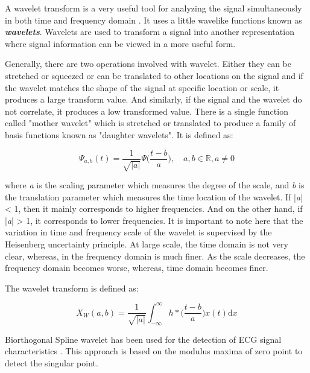 A wavelet transform is a very useful tool for analyzing the signal simultaneously in both time and frequency domain \cite{addison2017illustrated}. It uses a little wavelike functions known as \textbf{\textit{wavelets}}. Wavelets are used to transform a signal into another representation where signal information can be viewed in a more useful form.

Generally, there are two operations involved with wavelet. Either they can be stretched or squeezed or can be translated to other locations on the signal and if the wavelet matches the shape of the signal at specific location or scale, it produces a large transform value. And similarly, if the signal and the wavelet do not correlate, it produces a low transformed value. There is a single function called "mother wavelet" which is stretched or translated to produce a family of basis functions known as "daughter wavelets". It is defined as:

\begin{equation} \label{eqn_mother_wavelet}
{\Psi_{a,b}(t) = \frac{1}{\sqrt{|a|}}\Psi \bigg(\frac{t-b}{a}\bigg),\quad a, b \in \mathbb{R}, a \neq 0}
\end{equation}

where \textit{a} is the scaling parameter which measures the degree of the scale, and \textit{b} is the translation parameter which measures the time location of the wavelet. If |\textit{a}| < 1, then it mainly corresponds to higher frequencies. And on the other hand, if |\textit{a}| > 1, it corresponds to lower frequencies. It is important to note here that the variation in time and frequency scale of the wavelet is supervised by the Heisenberg uncertainty principle. At large scale, the time domain is not very clear, whereas, in the frequency domain is much finer. As the scale decreases, the frequency domain becomes worse, whereas, time domain becomes finer.

The wavelet transform is defined as:

\begin{equation} \label{eqn_wavelet_transform}
{X_{W}(a, b) = \frac{1}{\sqrt{|a|}} \int_{-\infty}^\infty h*\bigg(\frac{t-b}{a}\bigg)x(t) \mathrm{d}x}
\end{equation}


Biorthogonal Spline wavelet has been used for the detection of ECG signal characteristics \cite{zheng2008detection} \cite{pan2010detection} \cite{meena2014comparison}. This approach is based on the modulus maxima of zero point to detect the singular point. 


